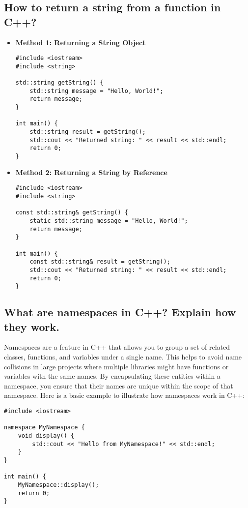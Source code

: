 \subsection{How to return a string from a function in C++?}
\begin{itemize}
\item \textbf{Method 1: Returning a String Object}
\begin{tcolorbox}[title=As an Object]
\begin{verbatim}
#include <iostream>
#include <string>

std::string getString() {
    std::string message = "Hello, World!";
    return message;
}

int main() {
    std::string result = getString();
    std::cout << "Returned string: " << result << std::endl;
    return 0;
}
\end{verbatim}
\end{tcolorbox}

\item \textbf{Method 2: Returning a String by Reference}
\begin{tcolorbox}[title=As a Reference]
\begin{verbatim}
#include <iostream>
#include <string>

const std::string& getString() {
    static std::string message = "Hello, World!";
    return message;
}

int main() {
    const std::string& result = getString();
    std::cout << "Returned string: " << result << std::endl;
    return 0;
}
\end{verbatim}
\end{tcolorbox}
\end{itemize}

\subsection{What are namespaces in C++? Explain how they work.}

Namespaces are a feature in C++ that allows you to group a set of related classes, functions, and variables under a single name. This helps to avoid name collisions in large projects where multiple libraries might have functions or variables with the same names. By encapsulating these entities within a namespace, you ensure that their names are unique within the scope of that namespace.
Here is a basic example to illustrate how namespaces work in C++:
\begin{tcolorbox}[title=Namespace]
\begin{verbatim}
#include <iostream>

namespace MyNamespace {
    void display() {
        std::cout << "Hello from MyNamespace!" << std::endl;
    }
}

int main() {
    MyNamespace::display();
    return 0;
}
\end{verbatim}
\end{tcolorbox}

